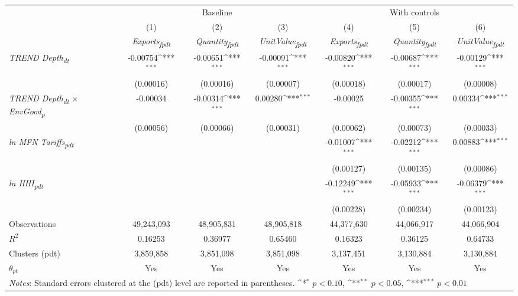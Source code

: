 {
\def\sym#1{\ifmmode^{#1}\else\(^{#1}\)\fi}
\begin{tabular}{l*{6}{c}}
\toprule
&\multicolumn{3}{c}{Baseline}&\multicolumn{3}{c}{With controls}\\\cmidrule(lr){2-4}\cmidrule(lr){5-7}
&(1)&(2)&(3)&(4)&(5)&(6)\\
&\textit{Exports\textsubscript{fpdt}}&\textit{Quantity\textsubscript{fpdt}}&\textit{UnitValue\textsubscript{fpdt}}&\textit{Exports\textsubscript{fpdt}}&\textit{Quantity\textsubscript{fpdt}}&\textit{UnitValue\textsubscript{fpdt}}\\
\midrule
\textit{TREND Depth\textsubscript{dt}} & -0.00754\sym{***} & -0.00651\sym{***} & -0.00091\sym{***} & -0.00820\sym{***} & -0.00687\sym{***} & -0.00129\sym{***}\\
 & (0.00016) & (0.00016) & (0.00007) & (0.00018) & (0.00017) & (0.00008)\\
\addlinespace
\textit{TREND Depth\textsubscript{dt} $\times$ EnvGood\textsubscript{p}} & -0.00034 & -0.00314\sym{***} & 0.00280\sym{***} & -0.00025 & -0.00355\sym{***} & 0.00334\sym{***}\\
 & (0.00056) & (0.00066) & (0.00031) & (0.00062) & (0.00073) & (0.00033)\\
\addlinespace
\textit{ln MFN Tariffs\textsubscript{pdt}} &  &  &  & -0.01007\sym{***} & -0.02212\sym{***} & 0.00883\sym{***}\\
 &  &  &  & (0.00127) & (0.00135) & (0.00086)\\
\addlinespace
\textit{ln HHI\textsubscript{pdt}} &  &  &  & -0.12249\sym{***} & -0.05933\sym{***} & -0.06379\sym{***}\\
 &  &  &  & (0.00228) & (0.00234) & (0.00123)\\
\midrule
Observations & 49,243,093 & 48,905,831 & 48,905,818 & 44,377,630 & 44,066,917 & 44,066,904\\
$R^{2}$ & 0.16253 & 0.36977 & 0.65460 & 0.16323 & 0.36125 & 0.64733\\
Clusters (pdt) & 3,859,858 & 3,851,098 & 3,851,098 & 3,137,451 & 3,130,884 & 3,130,884\\
$\theta_{pt}$ & Yes & Yes & Yes & Yes & Yes & Yes\\
\bottomrule
\multicolumn{7}{l}{\footnotesize \textit{Notes}: Standard errors clustered at the (pdt) level are reported in parentheses. \sym{*} \(p<0.10\), \sym{**} \(p<0.05\), \sym{***} \(p<0.01\)}\\
\end{tabular}
}
